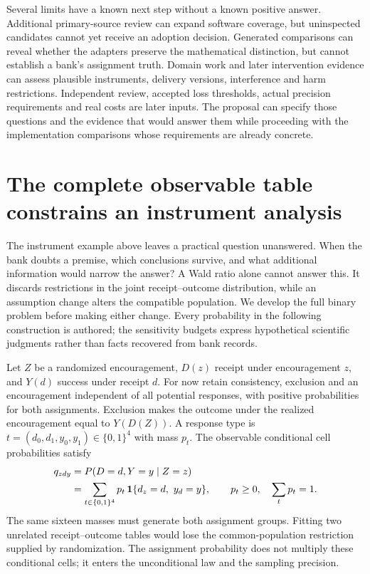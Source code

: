 Several limits have a known next step without a
known positive answer. Additional primary-source
review can expand software coverage, but uninspected
candidates cannot yet receive an adoption decision.
Generated comparisons can reveal whether the
adapters preserve the mathematical distinction,
but cannot establish a bank's assignment truth.
Domain work and later intervention evidence can
assess plausible instruments, delivery versions,
interference and harm restrictions. Independent
review, accepted loss thresholds, actual precision
requirements and real costs are later inputs.
The proposal can specify those questions and the
evidence that would answer them while proceeding
with the implementation comparisons whose
requirements are already concrete.
\label{exec17:s3-end}


\section{The complete observable table constrains an instrument analysis}
\label{exec17:s3-sensitivity}

The instrument example above leaves a practical question unanswered. When the
bank doubts a premise, which conclusions survive, and what additional
information would narrow the answer? A Wald ratio alone cannot answer this.
It discards restrictions in the joint receipt--outcome distribution, while
an assumption change alters the compatible population. We develop the full
binary problem before making either change. Every probability in the following
construction is authored; the sensitivity budgets express hypothetical
scientific judgments rather than facts recovered from bank records.
\citep{exec17_s3_sensitivity}

Let $Z$ be a randomized encouragement, $D(z)$ receipt under encouragement $z$,
and $Y(d)$ success under receipt $d$. For now retain consistency, exclusion
and an encouragement independent of all potential responses, with positive
probabilities for both assignments. Exclusion makes the outcome under the
realized encouragement equal to $Y(D(Z))$. A response type is
$t=(d_0,d_1,y_0,y_1)\in\{0,1\}^4$ with mass $p_t$. The observable
conditional cell probabilities satisfy
\begin{align}
 q_{zdy}
 &=P(D=d,Y=y\mid Z=z) \notag\\
 &=\sum_{t\in\{0,1\}^4}
      p_t\,{\bf1}\{d_z=d,\ y_d=y\}, \qquad
 p_t\geq0,\quad \sum_t p_t=1 .
 \label{exec17:s3-response-map}
\end{align}
The same sixteen masses must generate both assignment groups. Fitting two
unrelated receipt--outcome tables would lose the common-population
restriction supplied by randomization. The assignment probability does not
multiply these conditional cells; it enters the unconditional law and the
sampling precision.

